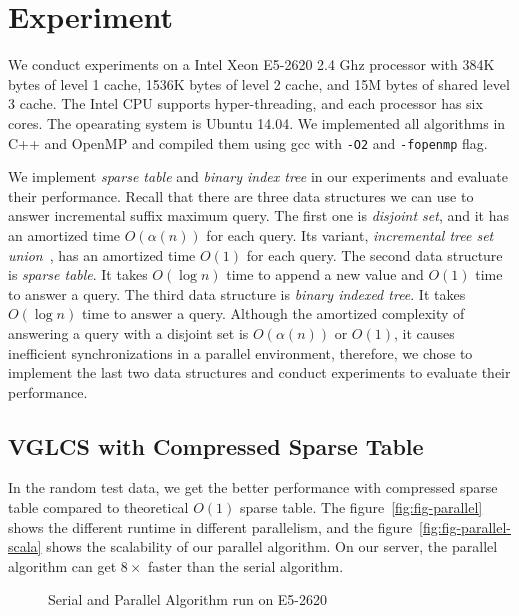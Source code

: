 \section{Experiment}
\label{sec:Experiment}

We conduct experiments on a Intel Xeon E5-2620 2.4 Ghz processor with
384K bytes of level 1 cache, 1536K bytes of level 2 cache, and 15M
bytes of shared level 3 cache.  The Intel CPU supports
hyper-threading, and each processor has six cores.  The opearating
system is Ubuntu 14.04.  We implemented all algorithms in C++ and
OpenMP and compiled them using gcc with {\tt -O2} and {\tt -fopenmp}
flag.

We implement {\em sparse table} and {\em binary index tree} in our
experiments and evaluate their performance.  Recall that there are
three data structures we can use to answer incremental suffix maximum
query.  The first one is {\em disjoint set}, and it has an amortized
time $O(\alpha(n))$ for each query.  Its variant, {\em incremental
  tree set union}~\cite{Gabow1983ALA}, has an amortized time $O(1)$
for each query.  The second data structure is {\em sparse table}.  It
takes $O(\log n)$ time to append a new value and $O(1)$ time to answer
a query.  The third data structure is {\em binary indexed tree}.  It
takes $O(\log n)$ time to answer a query.  Although the amortized
complexity of answering a query with a disjoint set is $O(\alpha(n))$
or $O(1)$, it causes inefficient synchronizations in a parallel
environment, therefore, we chose to implement the last two data
structures and conduct experiments to evaluate their performance.

\subsection{VGLCS with Compressed Sparse Table}

In the random test data, we get the better performance with compressed
sparse table compared to theoretical $O(1)$ sparse table.  The
figure~\ref{fig:fig-parallel} shows the different runtime in different
parallelism, and the figure~\ref{fig:fig-parallel-scala} shows the
scalability of our parallel algorithm.  On our server, the parallel
algorithm can get $8 \times$ faster than the serial algorithm.

\iffalse
我們運行優化策略中的空間壓縮版本，而非理論分析的 $\theta(1)$ 操作，
單次詢問落在 $O(s)$ 中，在實作上由於可以完全壓在暫存器上操作，效能表現較佳。
\fi

\begin{figure}
  \centering
  \caption{Serial and Parallel Algorithm run on E5-2620}
\end{figure}

